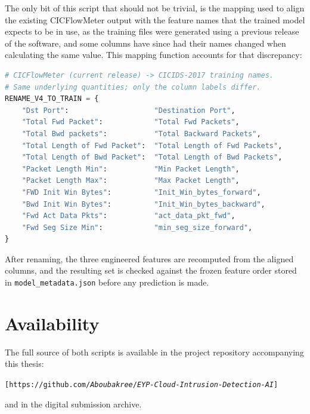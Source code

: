 The only bit of this script that should not be trivial, is the mapping used to align the existing CICFlowMeter output with the feature names that the trained model expects to be in use, as the training files were generated using a previous release of the software, and some columns have since had their names changed when calculating the same value. This mapping function accounts for that discrepancy:

\begin{lstlisting}[language=Python, basicstyle=\ttfamily\small, breaklines=true, columns=fullflexible]
# CICFlowMeter (current release) -> CICIDS-2017 training names.
# Same underlying quantities; only the column labels differ.
RENAME_V4_TO_TRAIN = {
    "Dst Port":                    "Destination Port",
    "Total Fwd Packet":            "Total Fwd Packets",
    "Total Bwd packets":           "Total Backward Packets",
    "Total Length of Fwd Packet":  "Total Length of Fwd Packets",
    "Total Length of Bwd Packet":  "Total Length of Bwd Packets",
    "Packet Length Min":           "Min Packet Length",
    "Packet Length Max":           "Max Packet Length",
    "FWD Init Win Bytes":          "Init_Win_bytes_forward",
    "Bwd Init Win Bytes":          "Init_Win_bytes_backward",
    "Fwd Act Data Pkts":           "act_data_pkt_fwd",
    "Fwd Seg Size Min":            "min_seg_size_forward",
}
\end{lstlisting}

\noindent After renaming, the three engineered features are recomputed from the aligned columns, and the resulting set is checked against the frozen feature order stored in \texttt{model\_metadata.json} before any prediction is made.

\section{Availability}
\label{app:scripts_availability}

The full source of both scripts is available in the project repository accompanying this thesis:

\begin{center}
\texttt{[https://github.com/\textit{Aboubakree}/\textit{EYP-Cloud-Intrusion-Detection-AI}]}
\end{center}

\noindent and in the digital submission archive.
